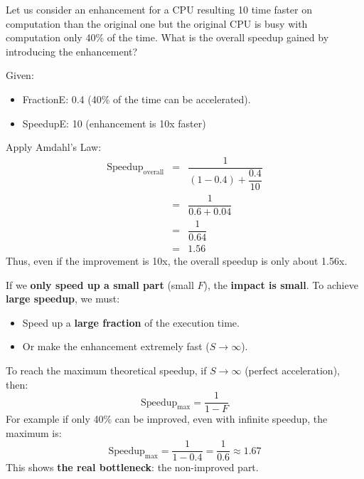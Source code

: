\begin{examplebox}
    Let us consider an enhancement for a CPU resulting 10 time faster on computation than the original one but the original CPU is busy with computation only 40\% of the time. What is the overall speedup gained by introducing the enhancement?

    \highspace
    Given:
    \begin{itemize}
        \item FractionE: 0.4 (40\% of the time can be accelerated).
        \item SpeedupE: 10 (enhancement is 10x faster)
    \end{itemize}
    Apply Amdahl's Law:
    \begin{equation*}
        \begin{array}{rcl}
            \text{Speedup}_{\text{overall}} &=& \dfrac{1}{(1-0.4) + \dfrac{0.4}{10}} \\ [1.5em]
            &=& \dfrac{1}{0.6 + 0.04} \\ [1.5em]
            &=& \dfrac{1}{0.64} \\ [1.5em]
            &=& 1.56
        \end{array}
    \end{equation*}
    Thus, even if the improvement is 10x, the overall speedup is only about 1.56x.
\end{examplebox}

\highspace
If we \textbf{only speed up a small part} (small $F$), the \textbf{impact is small}. To achieve \textbf{large speedup}, we must:
\begin{itemize}
    \item Speed up a \textbf{large fraction} of the execution time.
    \item Or make the enhancement extremely fast ($S \rightarrow \infty$).
\end{itemize}
To reach the maximum theoretical speedup, if $S \to \infty$ (perfect acceleration), then:
\begin{equation}
    \text{Speedup}_{\max} = \frac{1}{1-F}
\end{equation}
For example if only 40\% can be improved, even with infinite speedup, the maximum is:
\begin{equation*}
    \text{Speedup}_{\max} = \frac{1}{1-0.4} = \frac{1}{0.6} \approx 1.67
\end{equation*}
This shows \textbf{the real bottleneck}: the non-improved part.